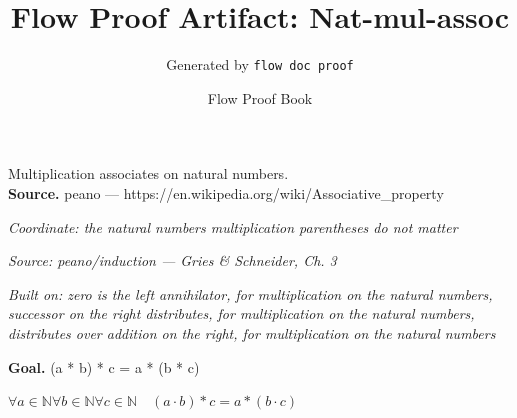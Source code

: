 \documentclass[11pt]{article}
\title{Flow Proof Artifact: Nat-mul-assoc}
\author{Generated by \texttt{flow doc proof}}
\date{Flow Proof Book}
\theoremstyle{definition}
\begin{document}
\maketitle
Multiplication associates on natural numbers.\\[0.5em]
\textbf{Source.} peano — https://en.wikipedia.org/wiki/Associative\_property\\[0.5em]
\bigskip
{}\par
\smallskip\noindent\textit{Coordinate: the natural numbers \cdot multiplication \cdot parentheses do not matter}\par
\smallskip\noindent\textit{Source: peano/induction — Gries \& Schneider, Ch. 3}\par
\smallskip\noindent\textit{Built on: zero is the left annihilator, for multiplication on the natural numbers, successor on the right distributes, for multiplication on the natural numbers, distributes over addition on the right, for multiplication on the natural numbers}\par
\medskip
\noindent\textbf{Goal.} (a * b) * c = a * (b * c)\par
\noindent$\displaystyle \forall a \in \mathbb{N} \forall b \in \mathbb{N} \forall c \in \mathbb{N}\quad (a \cdot b) * c = a * (b \cdot c)$\par
\medskip
\noindent
\end{document}
